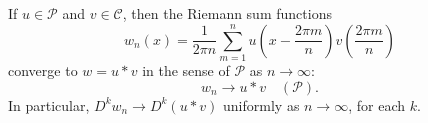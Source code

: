 If $u \in \mathcal{P}$ and $v \in \mathcal{C}$, then the Riemann sum functions
$$w_n(x) = \frac{1}{2\pi n} \sum_{m=1}^{n} u\left(x - \frac{2\pi m}{n}\right) v\left(\frac{2\pi m}{n}\right)$$
converge to $w = u * v$ in the sense of $\mathcal{P}$ as $n \to \infty$:
$$w_n \to u * v \quad (\mathcal{P}).$$
In particular, $D^k w_n \to D^k(u * v)$ uniformly as $n \to \infty$, for each $k$.
